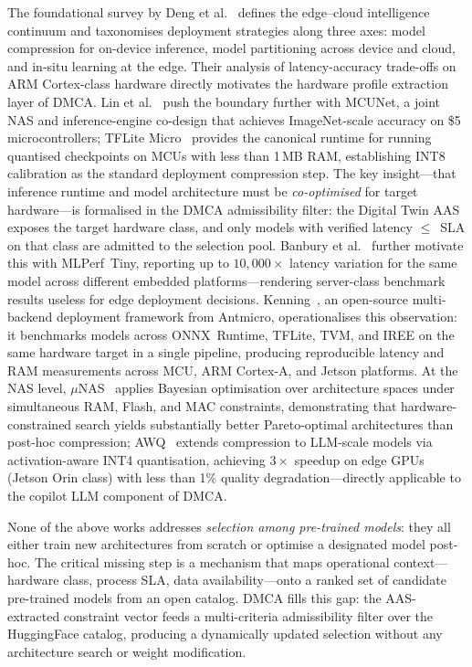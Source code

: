 The foundational survey by Deng et al.~\cite{deng2020edgeintelligence}
defines the edge–cloud intelligence continuum and taxonomises
deployment strategies along three axes: model compression for
on-device inference, model partitioning across device and cloud,
and in-situ learning at the edge.
Their analysis of latency-accuracy trade-offs on ARM Cortex-class
hardware directly motivates the hardware profile extraction layer
of DMCA.
Lin et al.~\cite{lin2020mcunet} push the boundary further with
MCUNet, a joint NAS and inference-engine co-design that achieves
ImageNet-scale accuracy on \$5 microcontrollers; TFLite
Micro~\cite{david2021tflitemicro} provides the canonical
runtime for running quantised checkpoints on MCUs with less than
1\,MB RAM, establishing INT8 calibration as the standard deployment
compression step.
The key insight—that inference runtime and model architecture must
be \emph{co-optimised} for target hardware—is formalised in the
DMCA admissibility filter: the Digital Twin AAS exposes the target
hardware class, and only models with verified latency $\leq$~SLA
on that class are admitted to the selection pool.
Banbury et al.~\cite{banbury2021mlperftiny} further motivate this
with MLPerf~Tiny, reporting up to $10{,}000\times$ latency variation
for the same model across different embedded platforms—rendering
server-class benchmark results useless for edge deployment decisions.
Kenning~\cite{dudek2023kenning}, an open-source multi-backend
deployment framework from Antmicro, operationalises this observation:
it benchmarks models across ONNX~Runtime, TFLite, TVM, and IREE
on the same hardware target in a single pipeline, producing
reproducible latency and RAM measurements across MCU, ARM Cortex-A,
and Jetson platforms.
At the NAS level, $\mu$NAS~\cite{liberis2021munas} applies
Bayesian optimisation over architecture spaces under simultaneous
RAM, Flash, and MAC constraints, demonstrating that
hardware-constrained search yields substantially better
Pareto-optimal architectures than post-hoc compression;
AWQ~\cite{lin2024awq} extends compression to LLM-scale models
via activation-aware INT4 quantisation, achieving $3\times$
speedup on edge GPUs (Jetson Orin class) with less than 1\%
quality degradation—directly applicable to the copilot LLM
component of DMCA.

None of the above works addresses \emph{selection among pre-trained
models}: they all either train new architectures from scratch or
optimise a designated model post-hoc.
The critical missing step is a mechanism that maps operational
context—hardware class, process SLA, data availability—onto a
ranked set of candidate pre-trained models from an open catalog.
DMCA fills this gap: the AAS-extracted constraint vector feeds
a multi-criteria admissibility filter over the HuggingFace catalog,
producing a dynamically updated selection without any architecture
search or weight modification.

